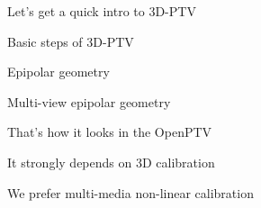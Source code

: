 \begin{frame}[label=ptv-4]{Let's get a quick intro to 3D-PTV}
\end{frame}


\begin{frame}[label=ptv-5]{Basic steps of 3D-PTV}
    \centering{}
\end{frame}


\begin{frame}[label=ptv-6]{Epipolar geometry}
    \centering{}
\end{frame}

\begin{frame}[label=ptv-7]{Multi-view epipolar geometry}
    \centering{}
\end{frame}

\begin{frame}[label=ptv-8]{That's how it looks in the OpenPTV}
    \centering{}
\end{frame}

\begin{frame}[label=ptv-9a]{It strongly depends on 3D calibration}
    \centering{}
\end{frame}


\begin{frame}[label=ptv-9b]{We prefer multi-media non-linear calibration}
    \centering{}
\end{frame}

